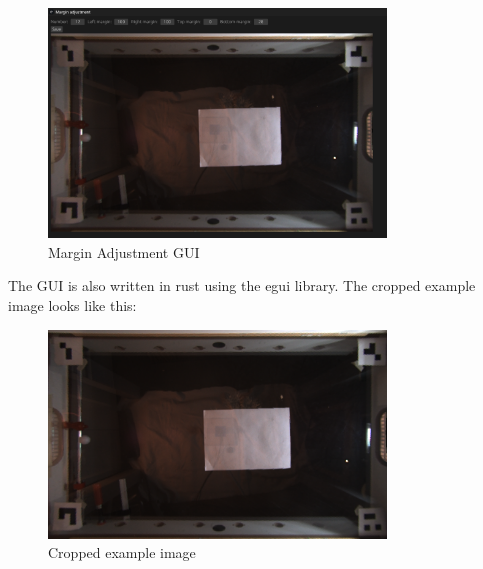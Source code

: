 \begin{figure}[H]
    \centering
    \includegraphics[width=0.8\textwidth]{../photos/margin_adj_gui}
    \caption[marginadjgui]{Margin Adjustment GUI}
    \label{fig:margin_adj_gui}
\end{figure}
The GUI is also written in rust using the egui\autocite{egui} library.
The cropped example image looks like this:
\begin{figure}[H]
    \centering
    \includegraphics[width=0.8\textwidth]{../photos/output12_cropped}
    \caption[croppedexampleimage]{Cropped example image}
    \label{fig:example8_cropped}
\end{figure}


